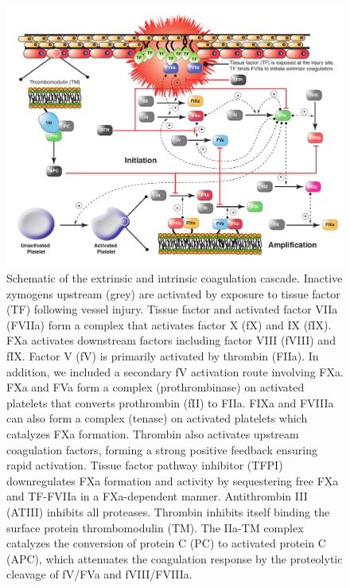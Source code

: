 \documentclass[12pt]{article}
\begin{document}
\begin{figure}[h]
\centering
\includegraphics[width=1.00\textwidth]{./figs/Figure_3_Coagulation_v4.pdf}
\caption{Schematic of the extrinsic and intrinsic coagulation cascade. Inactive zymogens upstream (grey) are activated by exposure to tissue factor (TF)  following vessel injury. Tissue factor and activated factor VIIa (FVIIa) form a complex that activates factor X (fX) and IX (fIX). FXa activates downstream factors including factor VIII (fVIII) and fIX. Factor V (fV) is primarily activated by thrombin (FIIa). In addition, we included a secondary fV activation route involving FXa. FXa and FVa form a complex (prothrombinase) on activated platelets that converts prothrombin (fII) to FIIa. FIXa and FVIIIa can also form a complex (tenase) on activated platelets which catalyzes FXa formation.  Thrombin also activates upstream coagulation factors, forming a strong positive feedback ensuring rapid activation. Tissue factor pathway inhibitor (TFPI) downregulates FXa formation and activity by sequestering free FXa and TF-FVIIa in a FXa-dependent manner. Antithrombin III (ATIII)  inhibits all proteases. Thrombin inhibits itself binding the surface protein thrombomodulin (TM). The IIa-TM complex catalyzes the conversion of protein C (PC) to activated protein C (APC), which attenuates the coagulation response by the proteolytic cleavage of fV/FVa and fVIII/FVIIIa. }\label{fig-coagulation-network}
\end{figure}

\clearpage
\end{document}
